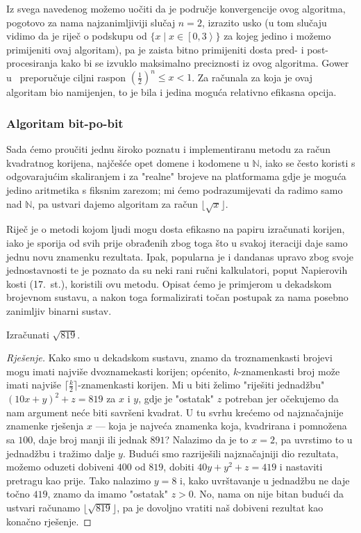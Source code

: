\documentclass[12pt]{scrartcl}
\newcommand{\primjer}[2]{%
    \renewcommand\qedsymbol{$\vartriangleleft$}%
    \begin{example}%
        #1%
    \end{example}%
    \begin{proof}[Rješenje]%
        #2%
    \end{proof}%
    \renewcommand\qedsymbol{$\square$}
}
\begin{document}
Iz svega navedenog možemo uočiti da je područje konvergencije ovog algoritma, pogotovo za nama najzanimljiviji slučaj $n=2$, izrazito usko
(u tom slučaju vidimo da je riječ o podskupu od $\{x\mid x\in\left[0,3\right>\}$ za kojeg jedino i možemo primijeniti ovaj algoritam), pa je
zaista bitno primijeniti dosta pred- i post-procesiranja kako bi se izvuklo maksimalno preciznosti iz ovog algoritma.
Gower u~\cite{gower} preporučuje ciljni raspon $(\frac12)^n\leq x<1$.
Za računala za koja je
ovaj algoritam bio
namijenjen, to je bila i jedina moguća relativno efikasna opcija.

\subsubsection{Algoritam bit-po-bit}
Sada ćemo proučiti jednu široko poznatu i implementiranu metodu za račun kvadratnog korijena, najčešće opet domene i kodomene u
$\mathbb{N}$, iako se često koristi s odgovarajućim skaliranjem i za "realne" brojeve
 na platformama gdje je moguća jedino aritmetika s fiksnim zarezom; mi ćemo podrazumijevati da radimo samo nad $\mathbb N$, pa ustvari
 dajemo algoritam za račun $\lfloor\sqrt x\rfloor$.

Riječ je o metodi kojom ljudi mogu dosta efikasno na papiru izračunati korijen, iako je sporija od svih prije obrađenih zbog toga
što u svakoj iteraciji daje samo jednu novu znamenku rezultata. Ipak, popularna je i dandanas upravo zbog svoje jednostavnosti te je
poznato da su neki rani ručni kalkulatori, poput Napierovih kosti (17.\ st.), koristili ovu metodu.
 Opisat ćemo je primjerom
u dekadskom brojevnom sustavu, a nakon toga formalizirati točan postupak za nama posebno zanimljiv binarni sustav.

\primjer{Izračunati $\sqrt{819}$.}
{Kako smo u dekadskom sustavu, znamo da troznamenkasti brojevi mogu imati najviše dvoznamekasti korijen; općenito, $k$-znamenkasti broj
može imati najviše $\lceil\frac{k}{2}\rceil$-znamenkasti korijen. Mi u biti želimo "riješiti jednadžbu" $(10x+y)^2+z=819$ za $x$ i $y$, gdje je 
"ostatak" $z$ potreban jer očekujemo da nam argument neće biti savršeni kvadrat. U tu svrhu krećemo od najznačajnije znamenke rješenja
$x$ --- koja je najveća znamenka koja, kvadrirana i pomnožena sa $100$, daje broj manji ili jednak $891$? Nalazimo da je to $x=2$, pa
uvrstimo to u jednadžbu i tražimo dalje $y$. Budući smo razriješili najznačajniji dio rezultata, možemo oduzeti dobiveni $400$ od $819$,
dobiti $40y+y^2+z=419$
i nastaviti pretragu kao prije. Tako nalazimo $y=8$ i, kako uvrštavanje u jednadžbu ne daje točno $419$,
znamo da imamo "ostatak" $z>0$. No, nama on nije bitan budući da ustvari računamo $\lfloor\sqrt{819}\rfloor$, pa je
 dovoljno vratiti naš dobiveni rezultat kao konačno rješenje.}
\end{document}
